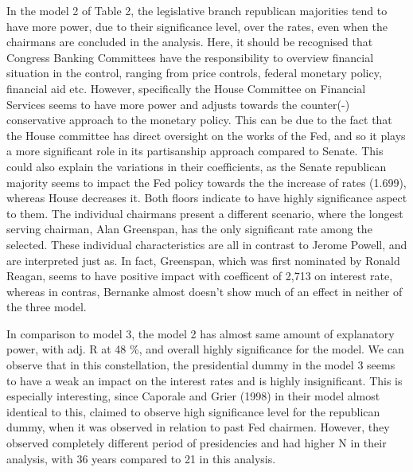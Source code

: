 \documentclass[11pt]{article}
\begin{document}
In the model 2 of Table 2, the legislative branch republican majorities tend to have more power, due to their significance level, over the rates, even when the chairmans are concluded in the analysis. Here, it should be recognised that Congress Banking Committees have the responsibility to overview financial situation in the control, ranging from price controls, federal monetary policy, financial aid etc. However, specifically the House Committee on Financial Services seems to have more power and adjusts towards the counter(-) conservative approach to the monetary policy. This can be due to the fact that the House committee has direct oversight on the works of the Fed, and so it plays a more significant role in its partisanship approach compared to Senate. This could also explain the variations in their coefficients, as the Senate republican majority seems to impact the Fed policy towards the the increase of rates (1.699), whereas House decreases it. Both floors indicate to have highly significance aspect to them.
The individual chairmans present a different scenario, where the longest serving chairman, Alan Greenspan, has the only significant rate among the selected. These individual characteristics are all in contrast to Jerome Powell, and are interpreted just as. In fact, Greenspan, which was first nominated by Ronald Reagan, seems to have positive impact with coefficent of 2,713 on interest rate, whereas in contras, Bernanke almost doesn't show much of an effect in neither of the three model. \


In comparison to model 3, the model 2 has almost same amount of explanatory power, with adj. R at 48 \%, and overall highly significance for the model. We can observe that in this constellation, the presidential dummy in the model 3 seems to have a weak an impact on the interest rates and is highly insignificant. This is especially interesting, since Caporale and Grier (1998) in their model almost identical to this, claimed to observe high significance level for the republican dummy, when it was observed in relation to past Fed chairmen. However, they observed completely different period of presidencies and had higher N in their analysis, with 36 years compared to 21 in this analysis.
\end{document}
